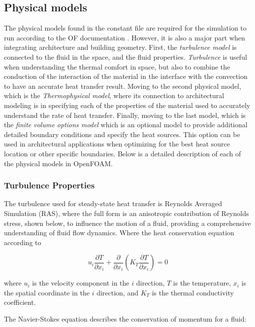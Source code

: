 \subsection{Physical models}
The physical models found in the constant file are required for the simulation to run according to the \gls{OF} documentation \cite{OFD}. However, it is also a major part when integrating architecture and building geometry. First, the \textit{turbulence model} is connected to the fluid in the space, and the fluid properties. \textit{Turbulence} is useful when understanding the thermal comfort in space, but also to combine the conduction of the interaction of the material in the interface with the convection to have an accurate heat transfer result. Moving to the second physical model, which is the \textit{Thermophysical model}, where its connection to architectural modeling is in specifying each of the properties of the material used to accurately understand the rate of heat transfer. Finally, moving to the last model, which is the \textit{finite volume options model} which is an optional model to provide additional detailed boundary conditions and specify the heat sources. This option can be used in architectural applications when optimizing for the best heat source location or other specific boundaries. Below is a detailed description of each of the physical models in OpenFOAM.


\subsubsection{Turbulence Properties}
The turbulence used for steady-state heat transfer is Reynolds Averaged Simulation (RAS), where the full form is an anisotropic contribution of Reynolds stress, shown below, to influence the motion of a fluid, providing a comprehensive understanding of fluid flow dynamics. Where the heat conservation equation according to \cite{hce}

\begin{equation}
u_i \frac{\partial T}{\partial x_i} + \frac{\partial}{\partial x_i}(K_T \frac{\partial T}{\partial x_i}) = 0 \label{eq:heat}
\end{equation}

where \(u_i\) is the velocity component in the \(i\) direction, \(T\) is the temperature, \(x_i\) is the spatial coordinate in the \(i\) direction, and \(K_T\) is the thermal conductivity coefficient.

The Navier-Stokes equation describes the conservation of momentum for a fluid:

